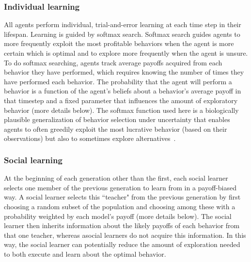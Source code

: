 \documentclass[letterpaper,11.5pt]{scrartcl}
\begin{document}
\subsubsection{Individual learning}

All agents perform individual, trial-and-error learning at each time step in
their lifespan.  Learning is guided by softmax search. Softmax search
guides agents to more frequently exploit the most profitable behaviors when the
agent is more certain which is optimal and to explore more frequently when the
agent is unsure.  To do softmax searching, agents track average payoffs acquired
from each behavior they have performed, which requires knowing the number of times they
have performed each behavior. The probability that the agent will perform a behavior is a function of the agent's beliefs about a behavior's average payoff in that timestep and a fixed parameter that influences the amount of exploratory behavior (more details below). The softmax function used here is a biologically plausible generalization of behavior selection under uncertainty that enables agents to often greedily exploit the most lucrative behavior (based on their observations) but also to sometimes explore alternatives~\cite{Schulz2019,Collins2013,Daw2006,Yechiam2005}.


\subsubsection{Social learning}

At the beginning of each generation other than the first, each social learner selects
one member of the previous generation to learn from in a payoff-biased way. 
A social learner selects this ``teacher" from the previous generation by first choosing a random subset of the population and choosing among these with a probability weighted by each model's payoff (more details below).  The social learner then inherits information about the likely payoffs of each behavior from that one teacher, whereas asocial learners do not acquire this information. In this way, the social learner can potentially reduce the amount of exploration needed to both execute and learn about the optimal behavior.  


\end{document}
